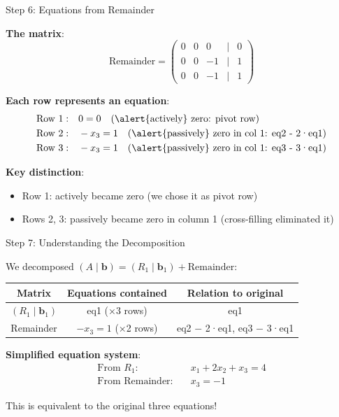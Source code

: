 \documentclass[10pt]{beamer}
\theoremstyle{definition}
\newcommand{\x}[1]{\alert{\textbf{#1}}}
\begin{document}
\begin{frame}{Step 6: Equations from Remainder}

\x{The matrix}:
$$\text{Remainder} = \begin{pmatrix}
0 & 0 & 0 & | & 0 \\
0 & 0 & -1 & | & 1 \\
0 & 0 & -1 & | & 1
\end{pmatrix}$$

\vspace{0.5em}

\x{Each row represents an equation}:
\begin{align*}
\text{Row 1}: &\quad 0 = 0 \quad \text{(\alert{actively} zero: pivot row)} \\
\text{Row 2}: &\quad -x_3 = 1 \quad \text{(\alert{passively} zero in col 1: eq2 - 2·eq1)} \\
\text{Row 3}: &\quad -x_3 = 1 \quad \text{(\alert{passively} zero in col 1: eq3 - 3·eq1)}
\end{align*}

\x{Key distinction}:
\begin{itemize}
\item Row 1: \alert{actively} became zero (we chose it as pivot row)
\item Rows 2, 3: \alert{passively} became zero in column 1 (cross-filling eliminated it)
\end{itemize}

\end{frame}

\begin{frame}{Step 7: Understanding the Decomposition}

We decomposed $(A \mid \mathbf{b}) = (R_1 \mid \mathbf{b}_1) + \text{Remainder}$:

\vspace{1em}

\begin{center}
\begin{tabular}{c|c|c}
\textbf{Matrix} & \textbf{Equations contained} & \textbf{Relation to original} \\
\hline
$(R_1 \mid \mathbf{b}_1)$ & eq1 (×3 rows) & eq1 \\
\hline
Remainder & $-x_3 = 1$ (×2 rows) & eq2 $-$ 2·eq1, eq3 $-$ 3·eq1 \\
\end{tabular}
\end{center}

\vspace{1em}

\x{Simplified equation system}:
\begin{align*}
\text{From } R_1: \quad &x_1 + 2x_2 + x_3 = 4 \\
\text{From Remainder}: \quad &x_3 = -1
\end{align*}

\vspace{0.5em}

This is equivalent to the original three equations!

\end{frame}
\end{document}
